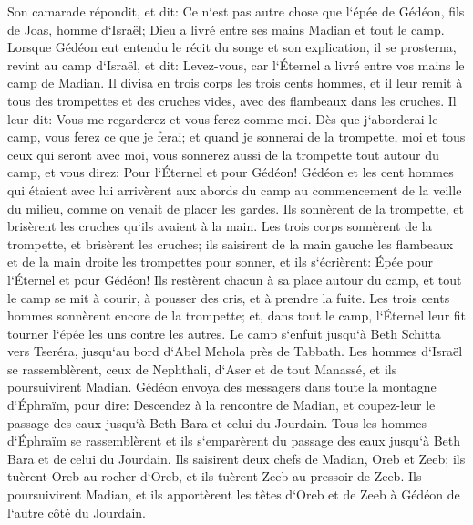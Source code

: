 \verse Son camarade répondit, et dit: Ce n`est pas autre chose que l`épée de Gédéon, fils de Joas, homme d`Israël; Dieu a livré entre ses mains Madian et tout le camp. 
\verse Lorsque Gédéon eut entendu le récit du songe et son explication, il se prosterna, revint au camp d`Israël, et dit: Levez-vous, car l`Éternel a livré entre vos mains le camp de Madian. 
\verse Il divisa en trois corps les trois cents hommes, et il leur remit à tous des trompettes et des cruches vides, avec des flambeaux dans les cruches. 
\verse Il leur dit: Vous me regarderez et vous ferez comme moi. Dès que j`aborderai le camp, vous ferez ce que je ferai; 
\verse et quand je sonnerai de la trompette, moi et tous ceux qui seront avec moi, vous sonnerez aussi de la trompette tout autour du camp, et vous direz: Pour l`Éternel et pour Gédéon! 
\verse Gédéon et les cent hommes qui étaient avec lui arrivèrent aux abords du camp au commencement de la veille du milieu, comme on venait de placer les gardes. Ils sonnèrent de la trompette, et brisèrent les cruches qu`ils avaient à la main. 
\verse Les trois corps sonnèrent de la trompette, et brisèrent les cruches; ils saisirent de la main gauche les flambeaux et de la main droite les trompettes pour sonner, et ils s`écrièrent: Épée pour l`Éternel et pour Gédéon! 
\verse Ils restèrent chacun à sa place autour du camp, et tout le camp se mit à courir, à pousser des cris, et à prendre la fuite. 
\verse Les trois cents hommes sonnèrent encore de la trompette; et, dans tout le camp, l`Éternel leur fit tourner l`épée les uns contre les autres. Le camp s`enfuit jusqu`à Beth Schitta vers Tseréra, jusqu`au bord d`Abel Mehola près de Tabbath. 
\verse Les hommes d`Israël se rassemblèrent, ceux de Nephthali, d`Aser et de tout Manassé, et ils poursuivirent Madian. 
\verse Gédéon envoya des messagers dans toute la montagne d`Éphraïm, pour dire: Descendez à la rencontre de Madian, et coupez-leur le passage des eaux jusqu`à Beth Bara et celui du Jourdain. Tous les hommes d`Éphraïm se rassemblèrent et ils s`emparèrent du passage des eaux jusqu`à Beth Bara et de celui du Jourdain. 
\verse Ils saisirent deux chefs de Madian, Oreb et Zeeb; ils tuèrent Oreb au rocher d`Oreb, et ils tuèrent Zeeb au pressoir de Zeeb. Ils poursuivirent Madian, et ils apportèrent les têtes d`Oreb et de Zeeb à Gédéon de l`autre côté du Jourdain. 

\chapter{}

